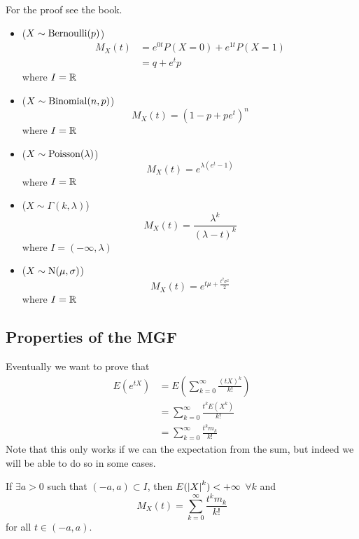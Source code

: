 \documentclass[12pt]{extarticle}
\newcommand{\Normal}{{\operatorfont N}}
\newcommand{\Poisson}{{\operatorfont Poisson}}
\begin{document}
For the proof see the book.
\begin{itemize}
    \item ($X \sim {\operatorfont Bernoulli}(p)$)
          \begin{align}
              M_X(t) & = e^{0t} P(X = 0) + e^{1t} P(X = 1) \\
                     & = q + e^t p
          \end{align}
          where $I = \mathbb{R}$
    \item ($X \sim {\operatorfont Binomial}(n, p)$)
          \begin{equation}
              M_X(t) = (1-p + p e^t)^n
          \end{equation}
          where $I = \mathbb{R}$
    \item ($X \sim \Poisson(\lambda)$)
          \begin{equation}
              M_X(t) = e^{\lambda (e^t -1)}
          \end{equation}
          where $I = \mathbb{R}$
    \item ($X \sim \Gamma(k, \lambda)$)
          \begin{equation}
              M_X(t) = \frac{\lambda^k}{(\lambda - t)^k}
          \end{equation}
          where $I = (-\infty, \lambda)$
    \item ($X \sim \Normal(\mu, \sigma)$)
          \begin{equation}
              M_X(t) = e^{t \mu + \frac{t^2 \sigma^2}{2}}
          \end{equation}
          where $I = \mathbb{R}$
\end{itemize}

\subsection{Properties of the MGF}

Eventually we want to prove that
\begin{align}
    E(e^{tX}) & = E\left(\sum_{k = 0}^\infty \frac{(tX)^k}{k!}\right) \\
              & = \sum_{k = 0}^{\infty} \frac{t^k E(X^k)}{k!}         \\
              & = \sum_{k = 0}^{\infty} \frac{t^k m_k}{k!}
\end{align}
Note that this only works if we can  the expectation from the sum, but indeed we will be able to do so in some cases.

\begin{theorem}
    \label{thm:mgf:mgf_expansion}
    If $\exists a > 0$ such that $(-a, a) \subset I$, then $E(\abs{X}^k) < +\infty$ $\forall k$ and
    \begin{equation}
        \label{eq:mgf:taylor}
        M_X(t) = \sum_{k = 0}^{\infty} \frac{t^k m_k}{k!}
    \end{equation}
    for all $t \in (-a, a)$.

\end{theorem}
\end{document}
